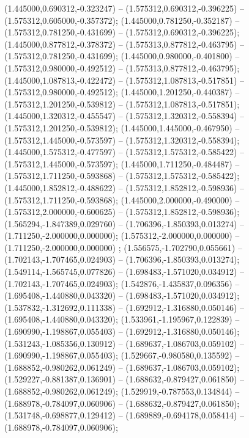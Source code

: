  (1.445000,0.690312,-0.323247) -- (1.575312,0.690312,-0.396225) -- (1.575312,0.605000,-0.357372);
 (1.445000,0.781250,-0.352187) -- (1.575312,0.781250,-0.431699) -- (1.575312,0.690312,-0.396225);
 (1.445000,0.877812,-0.378372) -- (1.575313,0.877812,-0.463795) -- (1.575312,0.781250,-0.431699);
 (1.445000,0.980000,-0.401800) -- (1.575312,0.980000,-0.492512) -- (1.575313,0.877812,-0.463795);
 (1.445000,1.087813,-0.422472) -- (1.575312,1.087813,-0.517851) -- (1.575312,0.980000,-0.492512);
 (1.445000,1.201250,-0.440387) -- (1.575312,1.201250,-0.539812) -- (1.575312,1.087813,-0.517851);
 (1.445000,1.320312,-0.455547) -- (1.575312,1.320312,-0.558394) -- (1.575312,1.201250,-0.539812);
 (1.445000,1.445000,-0.467950) -- (1.575312,1.445000,-0.573597) -- (1.575312,1.320312,-0.558394);
 (1.445000,1.575312,-0.477597) -- (1.575312,1.575312,-0.585422) -- (1.575312,1.445000,-0.573597);
 (1.445000,1.711250,-0.484487) -- (1.575312,1.711250,-0.593868) -- (1.575312,1.575312,-0.585422);
 (1.445000,1.852812,-0.488622) -- (1.575312,1.852812,-0.598936) -- (1.575312,1.711250,-0.593868);
 (1.445000,2.000000,-0.490000) -- (1.575312,2.000000,-0.600625) -- (1.575312,1.852812,-0.598936);
 (1.565294,-1.847389,0.029760) -- (1.706396,-1.850393,0.013274) -- (1.711250,-2.000000,0.000000);
 (1.575312,-2.000000,0.000000) -- (1.711250,-2.000000,0.000000) ;
 (1.556575,-1.702790,0.055661) -- (1.702143,-1.707465,0.024903) -- (1.706396,-1.850393,0.013274);
 (1.549114,-1.565745,0.077826) -- (1.698483,-1.571020,0.034912) -- (1.702143,-1.707465,0.024903);
 (1.542876,-1.435837,0.096356) -- (1.695408,-1.440880,0.043320) -- (1.698483,-1.571020,0.034912);
 (1.537832,-1.312692,0.111338) -- (1.692912,-1.316880,0.050146) -- (1.695408,-1.440880,0.043320);
 (1.533961,-1.195967,0.122839) -- (1.690990,-1.198867,0.055403) -- (1.692912,-1.316880,0.050146);
 (1.531243,-1.085356,0.130912) -- (1.689637,-1.086703,0.059102) -- (1.690990,-1.198867,0.055403);
 (1.529667,-0.980580,0.135592) -- (1.688852,-0.980262,0.061249) -- (1.689637,-1.086703,0.059102);
 (1.529227,-0.881387,0.136901) -- (1.688632,-0.879427,0.061850) -- (1.688852,-0.980262,0.061249);
 (1.529919,-0.787553,0.134844) -- (1.688978,-0.784097,0.060906) -- (1.688632,-0.879427,0.061850);
 (1.531748,-0.698877,0.129412) -- (1.689889,-0.694178,0.058414) -- (1.688978,-0.784097,0.060906);
